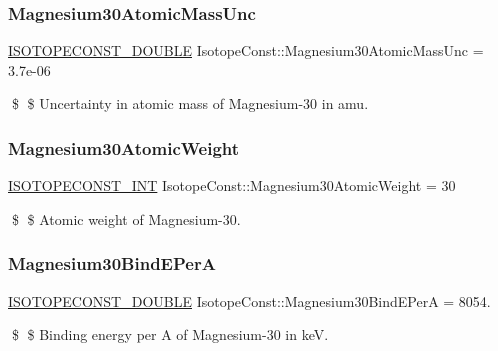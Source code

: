 \subsubsection{\texorpdfstring{Magnesium30\+Atomic\+Mass\+Unc}{Magnesium30AtomicMassUnc}}
{\footnotesize\ttfamily \mbox{\hyperlink{group___isotope_const-_macros_ga8f45a7272ce02c0b4c65c44636ed719a}{I\+S\+O\+T\+O\+P\+E\+C\+O\+N\+S\+T\+\_\+\+D\+O\+U\+B\+LE}} Isotope\+Const\+::\+Magnesium30\+Atomic\+Mass\+Unc = 3.\+7e-\/06}

\$ \$ Uncertainty in atomic mass of Magnesium-\/30 in amu. \mbox{\label{group___isotope_const-_magnesium-_mg30_ga05779bf10880d02f1b7fe62829cd8506}} 
\subsubsection{\texorpdfstring{Magnesium30\+Atomic\+Weight}{Magnesium30AtomicWeight}}
{\footnotesize\ttfamily \mbox{\hyperlink{group___isotope_const-_macros_ga5f18360b3e99483a35c32d789e62621c}{I\+S\+O\+T\+O\+P\+E\+C\+O\+N\+S\+T\+\_\+\+I\+NT}} Isotope\+Const\+::\+Magnesium30\+Atomic\+Weight = 30}

\$ \$ Atomic weight of Magnesium-\/30. \mbox{\label{group___isotope_const-_magnesium-_mg30_ga06b77c538f0197ec110e41474137d018}} 
\subsubsection{\texorpdfstring{Magnesium30\+Bind\+E\+PerA}{Magnesium30BindEPerA}}
{\footnotesize\ttfamily \mbox{\hyperlink{group___isotope_const-_macros_ga8f45a7272ce02c0b4c65c44636ed719a}{I\+S\+O\+T\+O\+P\+E\+C\+O\+N\+S\+T\+\_\+\+D\+O\+U\+B\+LE}} Isotope\+Const\+::\+Magnesium30\+Bind\+E\+PerA = 8054.}

\$ \$ Binding energy per A of Magnesium-\/30 in keV. \mbox{\label{group___isotope_const-_magnesium-_mg30_ga15655dd4f69888dcf6a2c5688ef83231}} 
